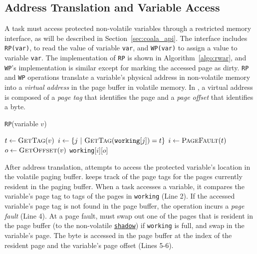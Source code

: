 \subsection{Address Translation and Variable Access}

A \sys task must access protected non-volatile variables through a restricted memory interface, as will be described in Section~\ref{sec:coala_api}. The interface includes \texttt{RP(var)}, to read the value of variable {\tt var}, and \texttt{WP(var)} to assign a value to variable {\tt var}. The implementation of {\tt RP} is shown in Algorithm~\ref{algo:rwar}, and {\tt WP}'s implementation is similar except for marking the accessed page as dirty.
%
{\tt RP} and {\tt WP} operations translate a variable's physical address in non-volatile memory into a \emph{virtual address} in the page buffer in volatile memory. In \sys, a virtual address is composed of a \emph{page tag} that identifies the page and a \emph{page offset} that identifies a byte.


\begin{algorithm}[t]
	\caption{\texttt{RP}(variable $v$)}
	\label{algo:rwar}
	\scriptsize
	\begin{algorithmic}[1]
		\State $t \leftarrow \Call{GetTag}{v}$ 
        \State $i \gets \{ j\ |\ \Call{GetTag}{\texttt{working}[j]} = t \}$ 
		 
		\State	$i \gets \Call{PageFault}{t}$ 
		\EndIf
		\State $o \leftarrow \Call{GetOffset}{v}$ 		
		\State \Return \texttt{working}[$i$][$o$]  
	\end{algorithmic}
\end{algorithm}

After address translation, \sys attempts to access the protected variable's location in the volatile paging buffer. \sys keeps track of the page tags for the pages currently resident in the paging buffer. When a task accesses a variable, it compares the variable's page tag to tags of the pages in {\tt working} (Line 2).
%
%
If the accessed variable's page tag is not found in the page buffer, the operation incurs a {\em page fault} (Line 4). At a page fault, \sys must swap out one of the pages that is resident in the page buffer (to the non-volatile \texttt{\underline{shadow}}) if \texttt{working} is full, and swap in the variable's page.
%
The byte is accessed in the page buffer at the index of the resident page and the variable's page offset (Lines 5-6).

